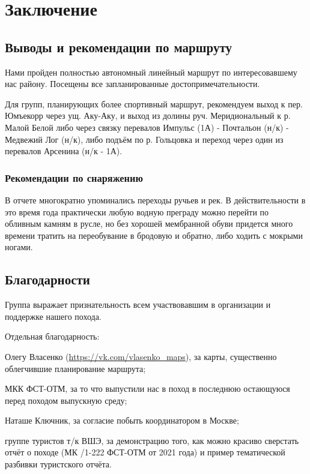 \section{Заключение}
\subsection{Выводы и рекомендации по маршруту}
Нами пройден полностью автономный линейный маршрут по интересовавшему нас району.
Посещены все запланированные достопримечательности.

Для групп, планирующих более спортивный маршрут, рекомендуем выход к пер. Юмъекорр через ущ. Аку-Аку,
и выход из долины руч. Меридиональный к р. Малой Белой либо через связку
перевалов Импульс (1А) - Почтальон (н/к) - Медвежий Лог (н/к), либо подъём по р. Гольцовка
и переход через один из перевалов Арсенина (н/к - 1А).

\subsubsection*{Рекомендации по снаряжению}
В отчете многократно упоминались переходы ручьев и рек.
В действительности в это время года практически любую водную преграду можно перейти по обливным камням в русле,
но без хорошей мембранной обуви придется много времени тратить на переобувание в бродовую и обратно,
либо ходить с мокрыми ногами.

\subsection{Благодарности}
Группа выражает признательность всем участвовавшим в организации и поддержке нашего похода.

Отдельная благодарность:

Олегу Власенко (\url{https://vk.com/vlasenko_maps}), за карты, существенно облегчившие планирование маршрута;

МКК ФСТ-ОТМ, за то что выпустили нас в поход в последнюю остающуюся перед походом выпускную среду;

Наташе Ключник, за согласие побыть координатором в Москве;

группе туристов т/к ВШЭ, за демонстрацию того, как можно красиво сверстать отчёт о походе
(МК /1-222 ФСТ-ОТМ от 2021 года) и пример тематической разбивки туристского отчёта.
